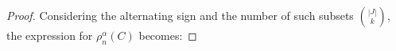 \documentclass[11pt,a4paper]{article}
\def\XX{{\mathbf X}}
\def\xx{{\mathbf x}}
\begin{document}
\begin{proof}
Considering the alternating sign and the number of such subsets $\binom{|J|}{k}$, the expression for $\rho_n^\alpha(C)$ becomes:

\end{proof}
\end{document}
